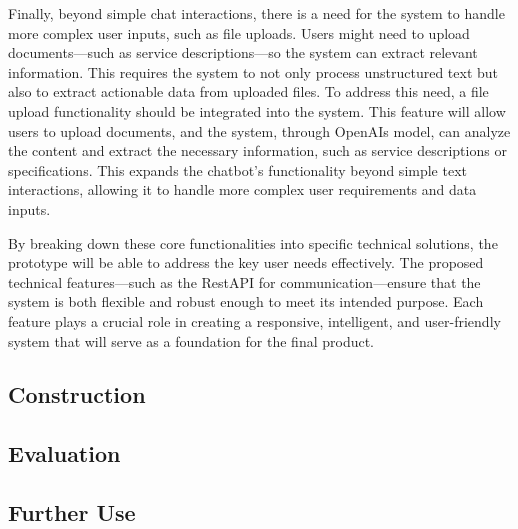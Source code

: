 Finally, beyond simple chat interactions, there is a need for the system to handle more complex user inputs, such as
file uploads. Users might need to upload documents—such as service descriptions—so the system can extract relevant
information. This requires the system to not only process unstructured text but also to extract actionable data from
uploaded files. To address this need, a file upload functionality should be integrated into the system. This feature
will allow users to upload documents, and the system, through OpenAIs model, can analyze the content and extract the
necessary information, such as service descriptions or specifications. This expands the chatbot’s functionality beyond
simple text interactions, allowing it to handle more complex user requirements and data inputs. %

By breaking down these core functionalities into specific technical solutions, the prototype will be able to address the
key user needs effectively. The proposed technical features—such as the RestAPI for communication—ensure that the system
is both flexible and robust enough to meet its intended purpose. Each feature plays a crucial role in creating a
responsive, intelligent, and user-friendly system that will serve as a foundation for the final product.

\subsection{Construction}\label{subsec:construction}





\subsection{Evaluation}\label{subsec:evaluation}

\subsection{Further Use}\label{subsec:further-use}

